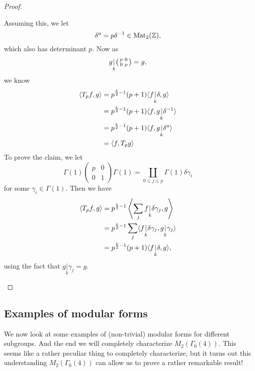 \documentclass[a4paper]{article}
\begin{document}
\begin{proof}
\begin{enumerate}
      Assuming this, we let
      \[
        \delta^a = p \delta^{-1} \in \mathrm{Mat}_2(\mathbb{Z}),
      \]
      which also has determinant $p$. Now as
      \[
        g \underset{k}{|}
        \begin{psmallmatrix}
          p & 0\\
          0 & p
        \end{psmallmatrix} = g,
      \]
      we know
      \begin{align*}
        \langle T_p f, g\rangle &= p^{\frac{k}{2} - 1}(p + 1) \langle f\underset{k}{|}\delta, g\rangle \\
        &= p^{\frac{k}{2} - 1} (p + 1) \langle f, g \underset{k}{|} \delta^{-1}\rangle \\
        &= p^{\frac{k}{2} - 1} (p + 1) \langle f, g \underset{k}{|} \delta^{a }\rangle \\
        &= \langle f, T_p g\rangle
      \end{align*}
      To prove the claim, we let
      \[
        \Gamma(1)
        \begin{pmatrix}
          p & 0\\
          0 & 1
        \end{pmatrix} \Gamma(1) =
        \coprod_{0 \leq j \leq p} \Gamma(1) \delta \gamma_i
      \]
      for some $\gamma_i \in \Gamma(1)$. Then we have
      \begin{align*}
        \langle T_p f, g\rangle &= p^{\frac{k}{2} - 1} \left\langle \sum_j f \underset{k}{|} \delta \gamma_j, g\right\rangle\\
        &= p^{\frac{k}{2} - 1} \sum_j \langle f\underset{k}{|} \delta \gamma_j, g \underset{k}{|} \gamma_j\rangle \\
        &= p^{\frac{k}{2} - 1} (p + 1) \langle f\underset{k}{|} \delta, g\rangle,
      \end{align*}
      using the fact that $g \underset{k}{|} \gamma_j = g$.\qedhere
  \end{enumerate}
\end{proof}

\subsection{Examples of modular forms}
We now look at some examples of (non-trivial) modular forms for different subgroups. And the end we will completely characterize $M_2(\Gamma_0(4))$. This seems like a rather peculiar thing to completely characterize, but it turns out this understanding $M_2(\Gamma_0(4))$ can allow us to prove a rather remarkable result!
\end{document}
